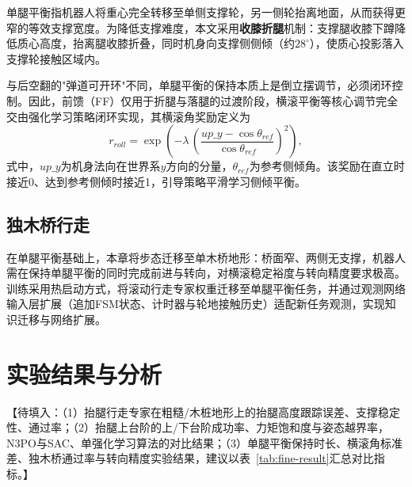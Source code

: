 单腿平衡指机器人将重心完全转移至单侧支撑轮，另一侧轮抬离地面，从而获得更窄的等效支撑宽度。为降低支撑难度，本文采用\textbf{收膝折腿}机制：支撑腿收膝下蹲降低质心高度，抬离腿收膝折叠，同时机身向支撑侧侧倾（约$28^\circ$），使质心投影落入支撑轮接触区域内。

与后空翻的"弹道可开环"不同，单腿平衡的保持本质上是倒立摆调节，必须闭环控制。因此，前馈（FF）仅用于折腿与落腿的过渡阶段，横滚平衡等核心调节完全交由强化学习策略闭环实现，其横滚角奖励定义为
\begin{equation}
  r_{roll} = \exp\left(-\lambda\,\left(\frac{up\_y - \cos\theta_{ref}}{\cos\theta_{ref}}\right)^2\right),
  \label{eq:rroll}
\end{equation}
式中，$up\_y$为机身法向在世界系$y$方向的分量，$\theta_{ref}$为参考侧倾角。该奖励在直立时接近0、达到参考侧倾时接近1，引导策略平滑学习侧倾平衡。

\subsection{独木桥行走}

在单腿平衡基础上，本章将步态迁移至单木桥地形：桥面窄、两侧无支撑，机器人需在保持单腿平衡的同时完成前进与转向，对横滚稳定裕度与转向精度要求极高。训练采用热启动方式，将滚动行走专家权重迁移至单腿平衡任务，并通过观测网络输入层扩展（追加FSM状态、计时器与轮地接触历史）适配新任务观测，实现知识迁移与网络扩展。

\section{实验结果与分析}

【待填入：（1）抬腿行走专家在粗糙/木桩地形上的抬腿高度跟踪误差、支撑稳定性、通过率；（2）抬腿上台阶的上/下台阶成功率、力矩饱和度与姿态越界率，N3PO与SAC、单强化学习算法的对比结果；（3）单腿平衡保持时长、横滚角标准差、独木桥通过率与转向精度实验结果，建议以表~\ref{tab:fine-result}汇总对比指标。】

\begin{table}[!htbp]
    \centering
    \label{tab:fine-result}
\end{table}

